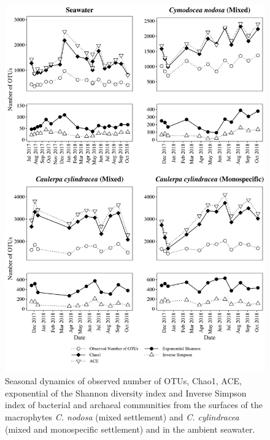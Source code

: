\documentclass[12pt,]{article}
\begin{document}
\begin{figure}[H]

{\centering \includegraphics[width=0.85\linewidth]{../results/figures/calculators} 

}

\caption{Seasonal dynamics of observed number of OTUs, Chao1, ACE, exponential of the Shannon diversity index and Inverse Simpson index of bacterial and archaeal communities from the surfaces of the macrophytes \textit{C. nodosa} (mixed settlement) and \textit{C. cylindracea} (mixed and monospecific settlement) and in the ambient seawater.\label{calculators}}\label{fig:unnamed-chunk-2}
\end{figure}
\end{document}
